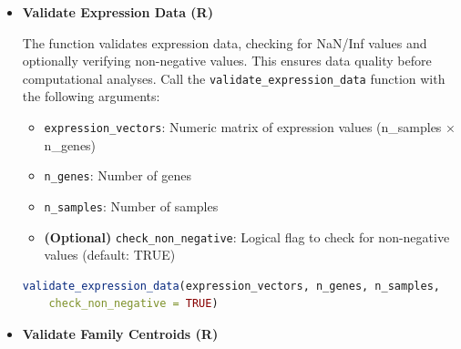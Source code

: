 \documentclass[11pt]{article}
\begin{document}
\begin{enumerate}
\begin{itemize}
\begin{itemize}
	      	      	\item \texttt{n\_genes}: Number of genes
	      	      	      
	      	      	\item \texttt{n\_families}: Number of gene families
	      	      \end{itemize}
	      	      
	      	      \begin{lstlisting}[language=R, caption={R Validate Gene to Family Mapping}]
validate_gene_to_family_mapping(gene_to_fam, n_genes, n_families)
	      	      \end{lstlisting}
	      	      
	      	\item \textbf{Validate Expression Data (R)}
	      	      
	      	      The function validates expression data, checking for NaN/Inf values and
	      	      optionally verifying non-negative values. This ensures data quality before
	      	      computational analyses. Call the \texttt{validate\_expression\_data} function
	      	      with the following arguments:
	      	      
	      	      \begin{itemize}
	      	      	\item \texttt{expression\_vectors}: Numeric matrix of expression values (n\_samples
	      	      	      × n\_genes)
	      	      	      
	      	      	\item \texttt{n\_genes}: Number of genes
	      	      	      
	      	      	\item \texttt{n\_samples}: Number of samples
	      	      	      
	      	      	\item \textbf{(Optional)} \texttt{check\_non\_negative}: Logical flag to
	      	      	      check for non-negative values (default: TRUE)
	      	      \end{itemize}
	      	      
	      	      \begin{lstlisting}[language=R, caption={R Validate Expression Data}]
validate_expression_data(expression_vectors, n_genes, n_samples, 
    check_non_negative = TRUE)
	      	      \end{lstlisting}
	      	      
	      	\item \textbf{Validate Family Centroids (R)}
	      	      

\end{itemize}
\end{enumerate}
\end{document}
